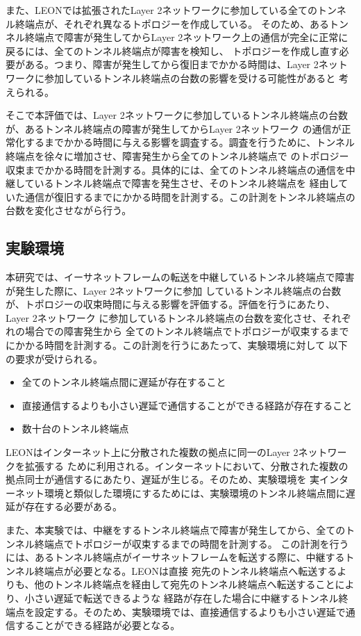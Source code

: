 また、LEONでは拡張されたLayer 2ネットワークに参加している全てのトンネル終端点が、それぞれ異なるトポロジーを作成している。
そのため、あるトンネル終端点で障害が発生してからLayer 2ネットワーク上の通信が完全に正常に戻るには、全てのトンネル終端点が障害を検知し、
トポロジーを作成し直す必要がある。つまり、障害が発生してから復旧までかかる時間は、Layer 2ネットワークに参加しているトンネル終端点の台数の影響を受ける可能性があると
考えられる。

そこで本評価では、Layer 2ネットワークに参加しているトンネル終端点の台数が、あるトンネル終端点の障害が発生してからLayer 2ネットワーク
の通信が正常化するまでかかる時間に与える影響を調査する。調査を行うために、トンネル終端点を徐々に増加させ、障害発生から全てのトンネル終端点で
のトポロジー収束までかかる時間を計測する。具体的には、全てのトンネル終端点の通信を中継しているトンネル終端点で障害を発生させ、そのトンネル終端点を
経由していた通信が復旧するまでにかかる時間を計測する。この計測をトンネル終端点の台数を変化させながら行う。

\subsection{実験環境}
\label{experiment:environment}

本研究では、イーサネットフレームの転送を中継しているトンネル終端点で障害が発生した際に、Layer 2ネットワークに参加
しているトンネル終端点の台数が、トポロジーの収束時間に与える影響を評価する。評価を行うにあたり、Layer 2ネットワーク
に参加しているトンネル終端点の台数を変化させ、それぞれの場合での障害発生から
全てのトンネル終端点でトポロジーが収束するまでにかかる時間を計測する。この計測を行うにあたって、実験環境に対して
以下の要求が受けられる。

\begin{itemize}
	\item{全てのトンネル終端点間に遅延が存在すること}
	\item{直接通信するよりも小さい遅延で通信することができる経路が存在すること}
	\item{数十台のトンネル終端点}
\end{itemize}

LEONはインターネット上に分散された複数の拠点に同一のLayer 2ネットワークを拡張する
ために利用される。インターネットにおいて、分散された複数の拠点同士が通信するにあたり、遅延が生じる。そのため、実験環境を
実インターネット環境と類似した環境にするためには、実験環境のトンネル終端点間に遅延が存在する必要がある。

また、本実験では、中継をするトンネル終端点で障害が発生してから、全てのトンネル終端点でトポロジーが収束するまでの時間を計測する。
この計測を行うには、あるトンネル終端点がイーサネットフレームを転送する際に、中継するトンネル終端点が必要となる。LEONは直接
宛先のトンネル終端点へ転送するよりも、他のトンネル終端点を経由して宛先のトンネル終端点へ転送することにより、小さい遅延で転送できるような
経路が存在した場合に中継するトンネル終端点を設定する。そのため、実験環境では、直接通信するよりも小さい遅延で通信することができる経路が必要となる。

